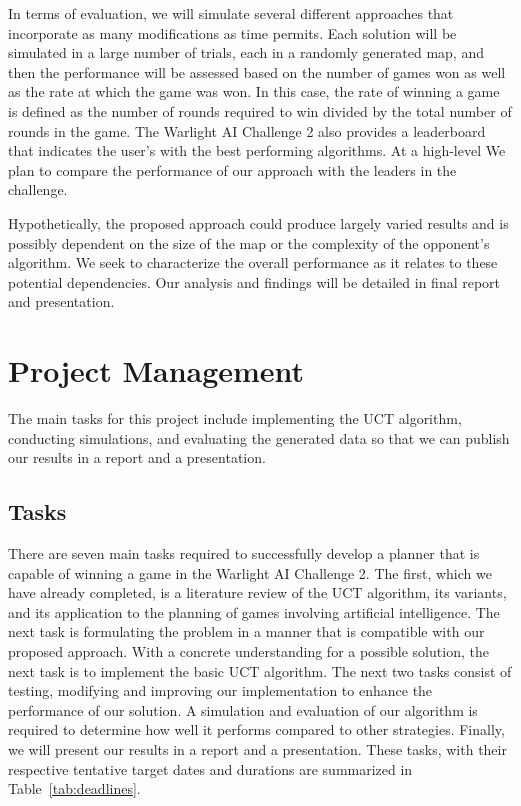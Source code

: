 \documentclass[a4paper,11pt]{article}
\begin{document}
In terms of evaluation, we will simulate several different approaches that incorporate as many modifications as time permits.  Each solution will be simulated in a large number of trials, each in a randomly generated map, and then the performance will be assessed based on the number of games won as well as the rate at which the game was won.  In this case, the rate of winning a game is defined as the number of rounds required to win divided by the total number of rounds in the game. The Warlight AI Challenge 2 also provides a leaderboard that indicates the user's with the best performing algorithms. At a high-level We plan to compare the performance of our approach with the leaders in the challenge.

Hypothetically, the proposed approach could produce largely varied results and is possibly dependent on the size of the map or the complexity of the opponent's algorithm. We seek to characterize the overall performance as it relates to these potential dependencies.  Our analysis and findings will be detailed in final report and presentation.



%
\section{Project Management}\label{sec:management}
The main tasks for this project include implementing the UCT algorithm, conducting simulations, and evaluating the generated data so that we can publish our results in a report and a presentation. 

\subsection{Tasks}\label{sec:tasks}
There are seven main tasks required to successfully develop a planner that is capable of winning a game in the Warlight AI Challenge 2.  The first, which we have already completed, is a literature review of the UCT algorithm, its variants, and its application to the planning of games involving artificial intelligence. The next task is formulating the problem in a manner that is compatible with our proposed approach. With a concrete understanding for a possible solution, the next task is to implement the basic UCT algorithm.  The next two tasks consist of testing, modifying and improving our implementation to enhance the performance of our solution.  A simulation and evaluation of our algorithm is required to determine how well it performs compared to other strategies. Finally, we will present our results in a report and a presentation.  These tasks, with their respective tentative target dates and durations are summarized in Table~\ref{tab:deadlines}.
\end{document}
